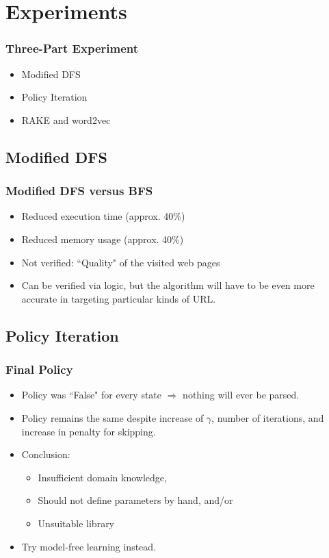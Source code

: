\documentclass{beamer}
\begin{document}
\section{Experiments}
\begin{frame}
\frametitle{Three-Part Experiment}
\begin{itemize}
\item Modified DFS
\item Policy Iteration
\item RAKE and word2vec
\end{itemize}
\end{frame}

\subsection{Modified DFS}
\begin{frame}
\frametitle{Modified DFS versus BFS}
\begin{itemize}
\item Reduced execution time (approx. 40\%)
\item Reduced memory usage (approx. 40\%)
\item Not verified: ``Quality" of the visited web pages
\item Can be verified via logic, but the algorithm will have to be even more accurate in targeting particular kinds of URL.
\end{itemize}
\end{frame}

\subsection{Policy Iteration}
\begin{frame}
\frametitle{Final Policy}
\begin{itemize}
\item Policy was ``False" for every state $ \Rightarrow $ nothing will ever be parsed.
\item Policy remains the same despite increase of $ \gamma $, number of iterations, and increase in penalty for skipping.
\item Conclusion:
\begin{itemize}
\item Insufficient domain knowledge,
\item Should not define parameters by hand, and/or
\item Unsuitable library
\end{itemize}
\item Try model-free learning instead.
\end{itemize}
\end{frame}
\end{document}
